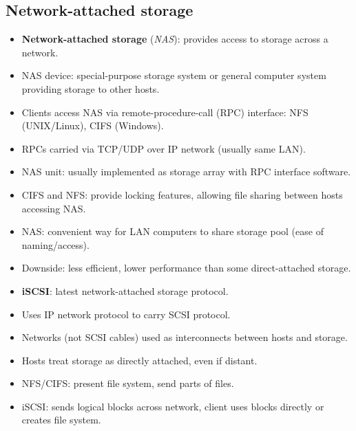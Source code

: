 \subsection{Network-attached storage}
\begin{itemize}
    \item \textbf{Network-attached storage} (\textit{NAS}): provides access to storage across a network.
    \item NAS device: special-purpose storage system or general computer system providing storage to other hosts.
    \item Clients access NAS via remote-procedure-call (RPC) interface: NFS (UNIX/Linux), CIFS (Windows).
    \item RPCs carried via TCP/UDP over IP network (usually same LAN).
    \item NAS unit: usually implemented as storage array with RPC interface software.
    \item CIFS and NFS: provide locking features, allowing file sharing between hosts accessing NAS.
    \item NAS: convenient way for LAN computers to share storage pool (ease of naming/access).
    \item Downside: less efficient, lower performance than some direct-attached storage.
    \item \textbf{iSCSI}: latest network-attached storage protocol.
    \item Uses IP network protocol to carry SCSI protocol.
    \item Networks (not SCSI cables) used as interconnects between hosts and storage.
    \item Hosts treat storage as directly attached, even if distant.
    \item NFS/CIFS: present file system, send parts of files.
    \item iSCSI: sends logical blocks across network, client uses blocks directly or creates file system.
\end{itemize}

